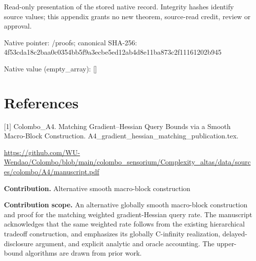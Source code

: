 \documentclass[10pt,a4paper]{article}
\begin{document}
Read-only presentation of the stored native record. Integrity hashes identify source values; this appendix grants no new theorem, source-read credit, review or approval.



Native pointer: /proofs; canonical SHA-256: 4f53cda18c2baa0c0354bb5f\allowbreak{}9a3ecbe5ed12ab4d8e11ba87\allowbreak{}3c2f11161202b945



Native value (empty\_array): []



\section{References}


[1] Colombo\_A4. Matching Gradient--Hessian Query Bounds via a Smooth Macro-Block Construction. A4\_gradient\_hessian\_matc\allowbreak{}hing\_publication.tex.



\url{https://github.com/WU-Wendao/Colombo/blob/main/colombo_sensorium/Complexity_altas/data/sources/colombo/A4/manuscript.pdf}



\textbf{Contribution.} Alternative smooth macro-block construction



\textbf{Contribution scope.} An alternative globally smooth macro-block construction and proof for the matching weighted gradient-Hessian query rate. The manuscript acknowledges that the same weighted rate follows from the existing hierarchical tradeoff construction, and emphasizes its globally C-infinity realization, delayed-disclosure argument, and explicit analytic and oracle accounting. The upper-bound algorithms are drawn from prior work.
\end{document}

